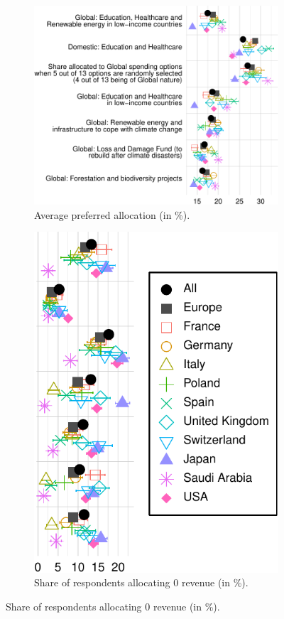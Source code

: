 \documentclass[12pt,english]{article}
\begin{document}
\begin{bibunit}
\begin{figure}
    \begin{subfigure}{.62\textwidth}
    \caption[]{Average preferred allocation (in \%).}
    \includegraphics[height=.38\textheight]{../figures/country_comparison/split_main_means_nolegend.pdf}
    \end{subfigure} 
  \begin{subfigure}{.38\textwidth}
    \caption[]{Share of respondents allocating 0 revenue (in \%).} 
    \includegraphics[height=.38\textheight]{../figures/country_comparison/split_main_nb0_nolabel.pdf}


\end{subfigure}
\end{figure}
\end{bibunit}
\end{document}
